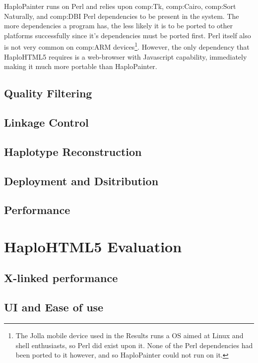 HaploPainter runs on Perl and relies upon \gls{comp:Tk}, \gls{comp:Cairo}, \gls{comp:Sort Naturally}, and \gls{comp:DBI} Perl dependencies to be present in the system. The more dependencies a program has, the less likely it is to be ported to other platforms successfully since it's dependencies must be ported first. Perl itself also is not very common on \gls{comp:ARM} devices\footnote{The Jolla mobile device used in the Results runs a OS aimed at Linux and shell enthusiasts, so Perl did exist upon it. None of the Perl dependencies had been ported to it however, and so HaploPainter could not run on it.}. However, the only dependency that HaploHTML5 requires is a web-browser with Javascript capability, immediately making it much more portable than HaploPainter.
















\subsection{Quality Filtering}
\subsection{Linkage Control}
\subsection{Haplotype Reconstruction}
\subsection{Deployment and Dsitribution}
\subsection{Performance}


\section{HaploHTML5 Evaluation}
\subsection{X-linked performance}
\subsection{UI and Ease of use}
